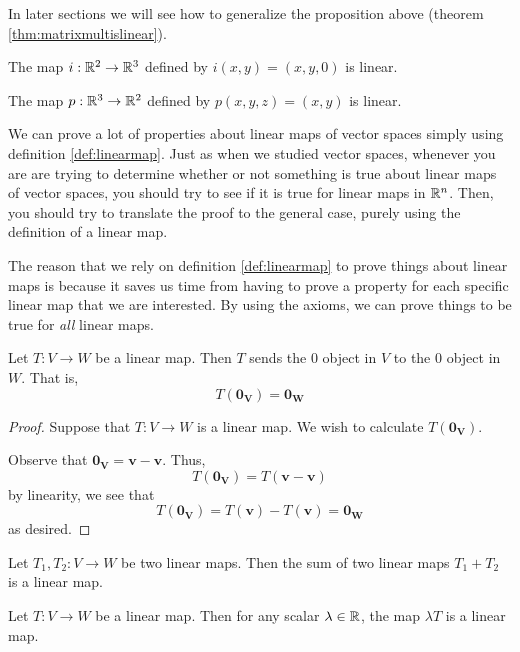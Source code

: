 In later sections we will see how to generalize the proposition above (theorem \ref{thm:matrixmultislinear}).

\begin{example}
The map $i: \mathbb{R}^2 \to \mathbb{R}^3$ defined by $i(x,y) = (x,y,0)$ is linear.
\end{example}

\begin{example}
The map $p: \mathbb{R}^3 \to \mathbb{R}^2$ defined by $p(x,y,z) = (x,y)$ is linear.
\end{example}

We can prove a lot of properties about linear maps of vector spaces simply using definition \ref{def:linearmap}.  Just as when we studied vector spaces, whenever you are are trying to determine whether or not something is true about linear maps of vector spaces, you should try to see if it is true for linear maps in $\mathbb{R}^n$.  Then, you should try to translate the proof to the general case, purely using the definition of a linear map.


The reason that we rely on definition \ref{def:linearmap} to prove things about linear maps is because it saves us time from having to prove a property for each specific linear map that we are interested.  By using the axioms, we can prove things to be true for \textit{all} linear maps.

\begin{proposition}\label{linearpreserves0}
Let $T: V \to W$ be a linear map.  Then $T$ sends the 0 object in $V$ to the 0 object in $W$.  That is, $$T(\bm{0_V}) = \bm{0_W}$$
\end{proposition}

\begin{proof}
    Suppose that $T: V \to W$ is a linear map. We wish to calculate $T(\bm{0_V})$.

    Observe that $\bm{0_V} = \bm{v}-\bm{v}$.  Thus, $$T(\bm{0_V}) = T(\bm{v}-\bm{v})$$
    by linearity, we see that $$T(\bm{0_V}) = T(\bm{v})-T(\bm{v}) = \bm{0_W}$$
    as desired.
\end{proof}


\begin{proposition}
Let $T_1, T_2: V \to W$ be two linear maps.  Then the sum of two linear maps $T_1 + T_2$ is a linear map.
\end{proposition}

\begin{proposition}
Let $T: V \to W$ be a linear map.  Then for any scalar $\lambda \in \mathbb{R}$, the map $\lambda T$ is a linear map.
\end{proposition}


